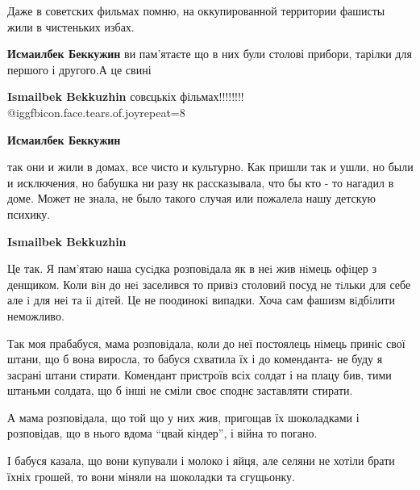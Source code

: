  
 
 
 
 
\zzSecCmt

\begin{itemize} %

Даже в советских фильмах помню, на оккупированной территории фашисты жили в
чистеньких избах.

\begin{itemize} %
\textbf{Исмаилбек Беккужин} ви пам'ятаєте що в них були столові прибори, тарілки для першого і другого.А це свині

\textbf{Ismailbek Bekkuzhin} совєцькіх фільмах!!!!!!!!  @igg{fbicon.face.tears.of.joy}{repeat=8} 

\textbf{Исмаилбек Беккужин} 

так они и жили в домах, все чисто и культурно. Как пришли так и ушли, но были и
исключения, но бабушка ни разу нк рассказывала, что бы кто - то нагадил в
доме. Может не знала, не было такого случая или пожалела нашу детскую психику.

\textbf{Ismailbek Bekkuzhin} 

Це так. Я пам'ятаю наша сусiдка розповiдала як в неi жив нiмець офiцер з
денщиком. Коли вiн до неi заселився то привiз столовий посуд не тiльки для себе
але i для неi та ii дiтей. Це не поодинокi випадки. Хоча сам фашизм вiдбiлити
неможливо.


Так моя прабабуся, мама розповідала, коли до неї постоялець німець приніс свої
штани, що б вона виросла, то бабуся схватила їх і до коменданта- не буду я
засрані штани стирати. Комендант пристроїв всіх солдат і на плацу бив, тими
штаньми солдата, що б інші не сміли своє споднє заставляти стирати.

А мама розповідала, що той що у них жив, пригощав їх шоколадками і розповідав,
що в нього вдома \enquote{цвай кіндер}, і війна то погано.

І бабуся казала, що вони купували і молоко і яйця, але селяни не хотіли брати
їхніх грошей, то вони міняли на шоколадки та сгущьонку.


\end{itemize}
\end{itemize}
